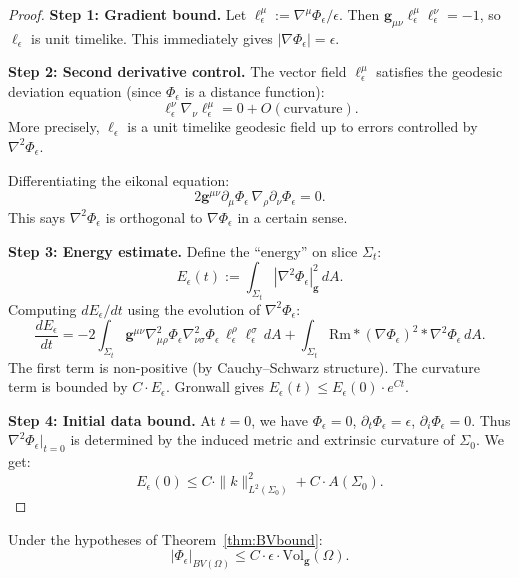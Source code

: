 \begin{proof}
\textbf{Step 1: Gradient bound.} Let $\ell_\epsilon^\mu := \nabla^\mu\Phi_\epsilon/\epsilon$. Then $\mathbf{g}_{\mu\nu}\ell_\epsilon^\mu\ell_\epsilon^\nu = -1$, so $\ell_\epsilon$ is unit timelike. This immediately gives $|\nabla\Phi_\epsilon| = \epsilon$.

\textbf{Step 2: Second derivative control.} The vector field $\ell_\epsilon^\mu$ satisfies the geodesic deviation equation (since $\Phi_\epsilon$ is a distance function):
\[
\ell_\epsilon^\nu\nabla_\nu\ell_\epsilon^\mu = 0 + O(\text{curvature}).
\]
More precisely, $\ell_\epsilon$ is a unit timelike geodesic field up to errors controlled by $\nabla^2\Phi_\epsilon$. 

Differentiating the eikonal equation:
\[
2\mathbf{g}^{\mu\nu}\partial_\mu\Phi_\epsilon \, \nabla_\rho\partial_\nu\Phi_\epsilon = 0.
\]
This says $\nabla^2\Phi_\epsilon$ is orthogonal to $\nabla\Phi_\epsilon$ in a certain sense.

\textbf{Step 3: Energy estimate.} Define the ``energy'' on slice $\Sigma_t$:
\[
E_\epsilon(t) := \int_{\Sigma_t} |\nabla^2\Phi_\epsilon|_{\mathbf{g}}^2 \, dA.
\]
Computing $dE_\epsilon/dt$ using the evolution of $\nabla^2\Phi_\epsilon$:
\[
\frac{dE_\epsilon}{dt} = -2\int_{\Sigma_t} \mathbf{g}^{\mu\nu}\nabla^2_{\mu\rho}\Phi_\epsilon \nabla^2_{\nu\sigma}\Phi_\epsilon \, \ell_\epsilon^\rho\ell_\epsilon^\sigma \, dA + \int_{\Sigma_t} \text{Rm} * (\nabla\Phi_\epsilon)^2 * \nabla^2\Phi_\epsilon \, dA.
\]
The first term is non-positive (by Cauchy--Schwarz structure). The curvature term is bounded by $C\cdot E_\epsilon$. Gronwall gives $E_\epsilon(t) \leq E_\epsilon(0) \cdot e^{Ct}$.

\textbf{Step 4: Initial data bound.} At $t = 0$, we have $\Phi_\epsilon = 0$, $\partial_t\Phi_\epsilon = \epsilon$, $\partial_i\Phi_\epsilon = 0$. Thus $\nabla^2\Phi_\epsilon|_{t=0}$ is determined by the induced metric and extrinsic curvature of $\Sigma_0$. We get:
\[
E_\epsilon(0) \leq C \cdot \|k\|_{L^2(\Sigma_0)}^2 + C \cdot A(\Sigma_0).
\]
\end{proof}

\begin{corollary}\label{cor:PhiBV}
Under the hypotheses of Theorem~\ref{thm:BVbound}:
\begin{equation}
    |\Phi_\epsilon|_{BV(\Omega)} \leq C \cdot \epsilon \cdot \mathrm{Vol}_{\mathbf{g}}(\Omega).
\end{equation}
\end{corollary}

